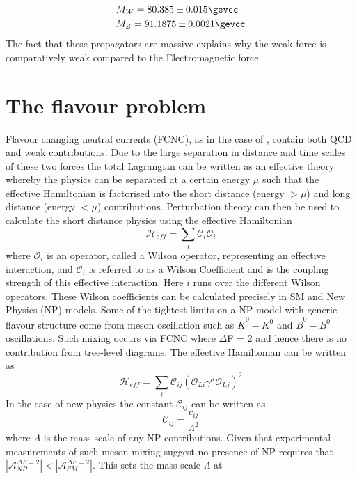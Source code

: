 \begin{equation}
  \begin{split}
  &M_{W} = 80.385 \pm 0.015 \gevcc\\
    &M_{Z} = 91.1875 \pm 0.0021 \gevcc\\
    \end{split}
\end{equation}
The fact that these propagators are massive explains why the weak force is comparatively weak compared to the Electromagnetic force.
\section{The flavour problem}
\label{subsec:mfv}
Flavour changing neutral currents (FCNC), as in the case of \Lbpi, contain both QCD and weak contributions. Due to the large separation in distance and time scales of these two forces the total Lagrangian can be written as an effective theory whereby the physics can be separated at a certain energy $\mu$ such that the effective Hamiltonian is factorised into the short distance (energy $>\mu$) and long distance (energy $<\mu$) contributions. Perturbation theory can then be used to calculate the short distance physics using the effective Hamiltonian
\begin{equation}
  \mathcal{H}_{eff} = \sum_{i}\mathcal{C}_{i}\mathcal{O}_{i}
  \end{equation}
where $\mathcal{O}_{i}$ is an operator, called a Wilson operator, representing an effective interaction, and $\mathcal{C}_{i}$ is referred to as a Wilson Coefficient and is the coupling strength of this effective interaction. Here $i$ runs over the different Wilson operators. These Wilson coefficients can be calculated precisely in SM and New Physics (NP) models. Some of the tightest limits on a NP model with generic flavour structure come from meson oscillation such as $\overline{K}^{0}-K^{0}$ and $\overline{B}^{0}-B^{0}$ oscillations.  Such mixing occurs via FCNC where $\Delta$F = 2 and hence there is no contribution from tree-level diagrams. The effective Hamiltonian can be written as
\begin{equation}
  \mathcal{H}_{eff} = \sum_{i}\mathcal{C}_{ij}(\mathcal{O}_{Li}\gamma^{\mu}\mathcal{O}_{Lj})^{2}
\end{equation}
In the case of new physics the constant $\mathcal{C}_{ij}$ can be written as 
\begin{equation}
\mathcal{C}_{ij} = \frac{c_{ij}}{\Lambda^{2}}
\end{equation}
where $\Lambda$ is the mass scale of any NP contributions. Given that experimental measurements of such meson mixing suggest no presence of NP requires that $|\mathcal{A}_{NP}^{\Delta F = 2}|<|\mathcal{A}_{SM}^{\Delta F = 2}|$. This  sets the mass scale $\Lambda$ at~\cite{kaonmix}
